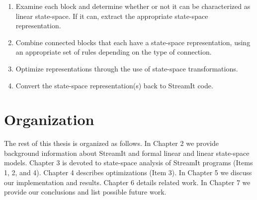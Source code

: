 \begin{enumerate}
\item Examine each block and determine whether or not it can be
characterized as linear state-space. If it can, extract the
appropriate state-space representation.

\item Combine connected blocks that each have a state-space
representation, using an appropriate set of rules depending on the
type of connection.

\item Optimize representations through the use of state-space
transformations.

\item Convert the state-space representation(s) back to StreamIt
code.
\end{enumerate}

\section{Organization}

    The rest of this thesis is organized as follows.  In Chapter 2 we
provide background information about StreamIt and formal linear
and linear state-space models.  Chapter 3 is devoted to
state-space analysis of StreamIt programs (Items 1, 2, and 4).
Chapter 4 describes optimizations (Item 3). In Chapter 5 we
discuss our implementation and results.  Chapter 6 details related
work.  In Chapter 7 we provide our conclusions and list possible
future work.
